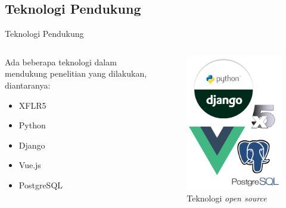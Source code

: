 \subsection{Teknologi Pendukung}

\begin{frame}{Teknologi Pendukung}
  \begin{columns}[t]
    \begin{column}{.5\linewidth}
      Ada beberapa teknologi dalam mendukung penelitian yang dilakukan, diantaranya:
      \begin{itemize}
        \item XFLR5
        \item Python
        \item Django
        \item Vue.js
        \item PostgreSQL
      \end{itemize}
    \end{column}
    \begin{column}{.5\linewidth}
      \begin{figure}[h]
        \centering
        \includegraphics[width=0.6\linewidth]{statics/stacks}
        \caption{Teknologi \textit{open source}}
        \label{fig:opentek}
      \end{figure}
    \end{column}
  \end{columns}
\end{frame}

